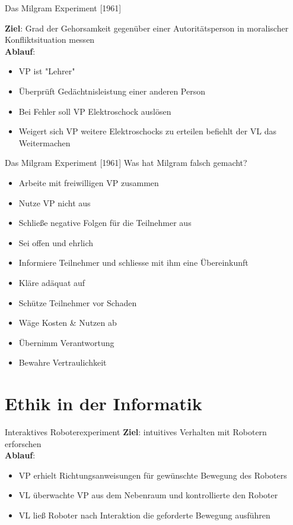 \documentclass[10pt]{beamer}
\begin{document}
	\begin{frame}{Das Milgram Experiment [1961]}
		
		\textbf{Ziel}: Grad der Gehorsamkeit gegenüber einer Autoritätsperson in moralischer Konfliktsituation messen\\
		
		\textbf{Ablauf}:
		\begin{itemize}
			\item VP ist "Lehrer"
			\item Überprüft Gedächtnisleistung einer anderen Person
			\item Bei Fehler soll VP Elektroschock auslösen
			\item Weigert sich VP weitere Elektroschocks zu erteilen befiehlt der VL das Weitermachen
		\end{itemize}
		
	\end{frame}
	
	\begin{frame}{Das Milgram Experiment [1961]}
		Was hat Milgram falsch gemacht?
			\begin{itemize}
				\item Arbeite mit freiwilligen VP zusammen
				\item Nutze VP nicht aus
				\item Schließe negative Folgen für die Teilnehmer aus
				\item Sei offen und ehrlich
				\item Informiere Teilnehmer und schliesse mit ihm eine Übereinkunft
				\item Kläre adäquat auf
				\item Schütze Teilnehmer vor Schaden
				\item Wäge Kosten \& Nutzen ab
				\item Übernimm Verantwortung
				\item Bewahre Vertraulichkeit
			\end{itemize}
	\end{frame}

\section{Ethik in der Informatik}
	

	
	\begin{frame}{Interaktives Roboterexperiment}
		\textbf{Ziel}: intuitives Verhalten mit Robotern erforschen\\
		\vspace{0.8cm}
		\textbf{\textbf{Ablauf}}:
		\begin{itemize}
			\item VP erhielt Richtungsanweisungen für gewünschte Bewegung des Roboters
			\item VL überwachte VP aus dem Nebenraum und kontrollierte den Roboter
			\item VL ließ Roboter nach Interaktion die geforderte Bewegung ausführen
		\end{itemize}
	\end{frame}
	
\end{document}
